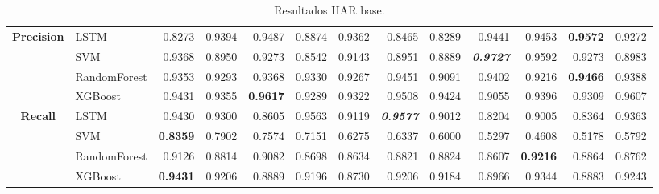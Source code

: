 \begin{table}[H]
\begin{adjustbox}{max width=14cm}
\begin{tabular}{|c|l|r|r|r|r|r|r|r|r|r|r|r|}
			\hline
			\textbf{Precision} &  LSTM &  0.8273 &  0.9394 &  0.9487 &  0.8874 &  0.9362 &  0.8465 &  0.8289 &  0.9441 &  0.9453 & \textbf{  0.9572 } &  0.9272 \\
			&  SVM &  0.9368 &  0.8950 &  0.9273 &  0.8542 &  0.9143 &  0.8951 &  0.8889 & \textit{ \textbf{  0.9727 } } &  0.9592 &  0.9273 &  0.8983 \\
			&  RandomForest &  0.9353 &  0.9293 &  0.9368 &  0.9330 &  0.9267 &  0.9451 &  0.9091 &  0.9402 &  0.9216 & \textbf{  0.9466 } &  0.9388 \\
			&  XGBoost &  0.9431 &  0.9355 & \textbf{  0.9617 } &  0.9289 &  0.9322 &  0.9508 &  0.9424 &  0.9055 &  0.9396 &  0.9309 &  0.9607 \\
			\hline
			\textbf{Recall} &  LSTM &  0.9430 &  0.9300 &  0.8605 &  0.9563 &  0.9119 & \textit{ \textbf{  0.9577 } } &  0.9012 &  0.8204 &  0.9005 &  0.8364 &  0.9363 \\
			&  SVM & \textbf{  0.8359 } &  0.7902 &  0.7574 &  0.7151 &  0.6275 &  0.6337 &  0.6000 &  0.5297 &  0.4608 &  0.5178 &  0.5792 \\
			&  RandomForest &  0.9126 &  0.8814 &  0.9082 &  0.8698 &  0.8634 &  0.8821 &  0.8824 &  0.8607 & \textbf{  0.9216 } &  0.8864 &  0.8762 \\
			&  XGBoost & \textbf{  0.9431 } &  0.9206 &  0.8889 &  0.9196 &  0.8730 &  0.9206 &  0.9184 &  0.8966 &  0.9344 &  0.8883 &  0.9243 \\
			\hline
		\end{tabular}
	\end{adjustbox}
	\caption{Resultados HAR base.}
	\label{tab:HAR_base}
\end{table}
